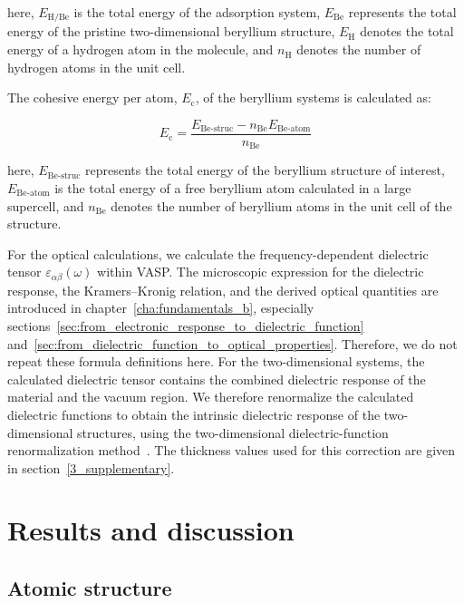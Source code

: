 here,
$E_{\mathrm{H/Be}}$ is the total energy of the adsorption system,
$E_{\mathrm{Be}}$ represents the total energy of the pristine two-dimensional beryllium structure,
$E_{\mathrm{H}}$ denotes the total energy of a hydrogen atom in the  molecule,
and $n_{\mathrm{H}}$ denotes the number of hydrogen atoms in the unit cell.

The cohesive energy per atom, $E_{\mathrm{c}}$, of the beryllium systems is calculated as:

\begin{equation}
    E_{\mathrm{c}} =
    \frac{E_{\mathrm{Be\text{-}struc}} - n_{\mathrm{Be}}E_{\mathrm{Be\text{-}atom}}}{n_{\mathrm{Be}}}
\label{cohesive_energy_per_atom_beryllene}
\end{equation}

here,
$E_{\mathrm{Be\text{-}struc}}$ represents the total energy of the beryllium structure of interest,
$E_{\mathrm{Be\text{-}atom}}$ is the total energy of a free beryllium atom calculated in a large supercell,
and $n_{\mathrm{Be}}$ denotes the number of beryllium atoms in the unit cell of the structure.

For the optical calculations,
we calculate the frequency-dependent dielectric tensor $\varepsilon_{\alpha\beta}(\omega)$ within VASP.
The microscopic expression for the dielectric response,
the Kramers--Kronig relation,
and the derived optical quantities are introduced in chapter~\ref{cha:fundamentals_b},
especially sections~\ref{sec:from_electronic_response_to_dielectric_function} and~\ref{sec:from_dielectric_function_to_optical_properties}.
Therefore, we do not repeat these formula definitions here.
For the two-dimensional systems,
the calculated dielectric tensor contains the combined dielectric response of the material and the vacuum region.
We therefore renormalize the calculated dielectric functions to obtain the intrinsic dielectric response of the two-dimensional structures,
using the two-dimensional dielectric-function renormalization method~\cite{yang2021method}.
The thickness values used for this correction are given in section~\ref{3_supplementary}.

\section{Results and discussion}
\label{3_results}

\subsection{Atomic structure}
\label{3_atomic_structure}

